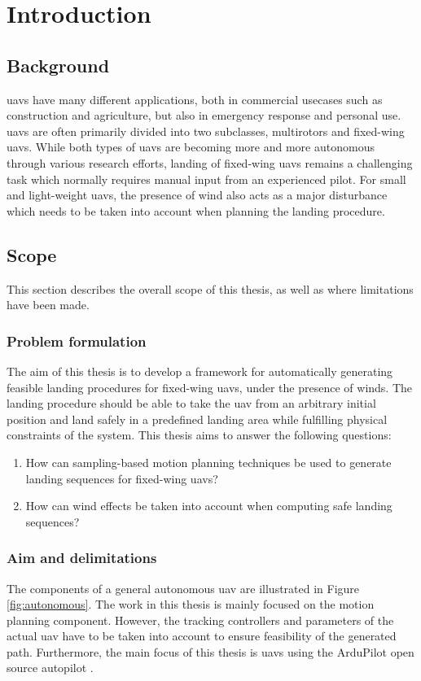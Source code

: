 \chapter{Introduction}
\acresetall
\section{Background}
\acp{uav} have many different applications, both in commercial 
usecases such as construction and agriculture, but also in emergency response and personal use. 
\acp{uav} are often primarily divided into two subclasses, multirotors and fixed-wing \acp{uav}. 
While both types of \acp{uav} are becoming more and more autonomous through various research efforts, landing of fixed-wing \acp{uav} remains a challenging task which 
normally requires manual input from an experienced pilot. For small and light-weight \acp{uav}, the presence of wind also acts as a major disturbance which needs to be taken into account when planning 
the landing procedure.
\section{Scope}
This section describes the overall scope of this thesis, as well as where limitations have been made.
\subsection{Problem formulation}
The aim of this thesis is to develop a framework for automatically generating feasible 
landing procedures for fixed-wing \acp{uav}, under the presence of winds. The landing procedure should be able to take the \ac{uav} 
from an arbitrary initial position and land safely in a predefined landing area while fulfilling physical constraints of the system. 
This thesis aims to answer the following questions:
\begin{enumerate}
    \item How can sampling-based motion planning techniques be used to generate landing sequences for fixed-wing \acp{uav}?
    \item How can wind effects be taken into account when computing safe landing sequences?
\end{enumerate}
\subsection{Aim and delimitations}\label{sec:aims}
The components of a general autonomous \ac{uav} are illustrated in Figure \ref{fig:autonomous}. The work in this thesis 
is mainly focused on the motion planning component. However, the tracking controllers and parameters of the actual \ac{uav} have to be taken into account 
to ensure feasibility of the generated path. Furthermore, the main focus of this thesis is \acp{uav} using the ArduPilot open source autopilot \cite{arduplane}.


